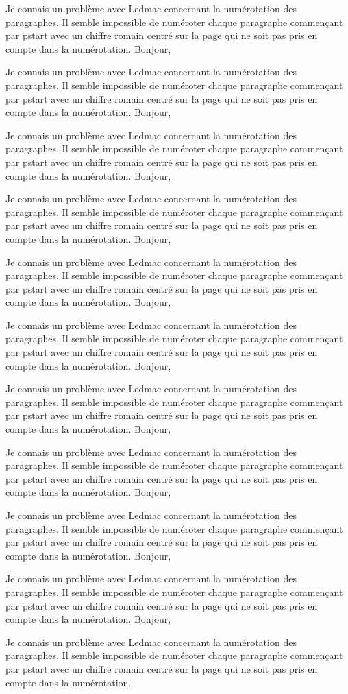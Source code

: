 \documentclass{article}
\begin{document}
Je connais un problème avec Ledmac concernant la numérotation des paragraphes. Il semble impossible de numéroter chaque paragraphe commençant par pstart avec un chiffre romain centré sur la page qui ne soit pas pris en compte dans la numérotation.\pend
\pstart Bonjour,

Je connais un problème avec Ledmac concernant la numérotation des paragraphes. Il semble impossible de numéroter chaque paragraphe commençant par pstart avec un chiffre romain centré sur la page qui ne soit pas pris en compte dans la numérotation.\pend
\pstart Bonjour,

Je connais un problème avec Ledmac concernant la numérotation des paragraphes. Il semble impossible de numéroter chaque paragraphe commençant par pstart avec un chiffre romain centré sur la page qui ne soit pas pris en compte dans la numérotation.\pend
\pstart Bonjour,

Je connais un problème avec Ledmac concernant la numérotation des paragraphes. Il semble impossible de numéroter chaque paragraphe commençant par pstart avec un chiffre romain centré sur la page qui ne soit pas pris en compte dans la numérotation.\pend
\pstart Bonjour,

Je connais un problème avec Ledmac concernant la numérotation des paragraphes. Il semble impossible de numéroter chaque paragraphe commençant par pstart avec un chiffre romain centré sur la page qui ne soit pas pris en compte dans la numérotation.\pend
\pstart Bonjour,

Je connais un problème avec Ledmac concernant la numérotation des paragraphes. Il semble impossible de numéroter chaque paragraphe commençant par pstart avec un chiffre romain centré sur la page qui ne soit pas pris en compte dans la numérotation.\pend
\pstart Bonjour,

Je connais un problème avec Ledmac concernant la numérotation des paragraphes. Il semble impossible de numéroter chaque paragraphe commençant par pstart avec un chiffre romain centré sur la page qui ne soit pas pris en compte dans la numérotation.\pend
\pstart Bonjour,

Je connais un problème avec Ledmac concernant la numérotation des paragraphes. Il semble impossible de numéroter chaque paragraphe commençant par pstart avec un chiffre romain centré sur la page qui ne soit pas pris en compte dans la numérotation.\pend
\pstart Bonjour,

Je connais un problème avec Ledmac concernant la numérotation des paragraphes. Il semble impossible de numéroter chaque paragraphe commençant par pstart avec un chiffre romain centré sur la page qui ne soit pas pris en compte dans la numérotation.\pend
\pstart Bonjour,

Je connais un problème avec Ledmac concernant la numérotation des paragraphes. Il semble impossible de numéroter chaque paragraphe commençant par pstart avec un chiffre romain centré sur la page qui ne soit pas pris en compte dans la numérotation.\pend
\pstart Bonjour,

Je connais un problème avec Ledmac concernant la numérotation des paragraphes. Il semble impossible de numéroter chaque paragraphe commençant par pstart avec un chiffre romain centré sur la page qui ne soit pas pris en compte dans la numérotation.\pend
\endnumbering
\end{document}
